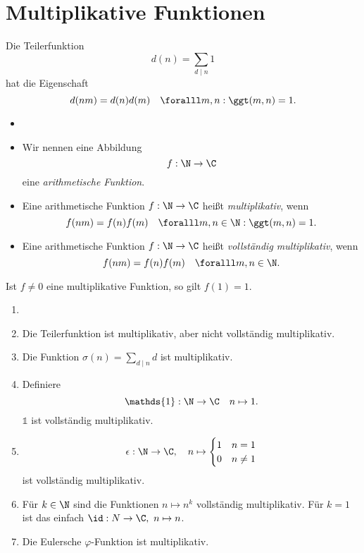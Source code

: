 \chapter{Multiplikative Funktionen}

\begin{exmp*}
	Die Teilerfunktion
	\[ d(n) = \sum_{d \mid n} 1 \]
	hat die Eigenschaft
	\[ d(nm) = d(n)d(m) \quad \foralll m,n: \ggt(m,n)=1. \]
\end{exmp*}

\begin{defn*}
	\begin{itemize}
		\item []
		\item Wir nennen eine Abbildung
			\[ f: \N \to \C \]
			eine \emph{arithmetische Funktion}.
		\item Eine arithmetische Funktion $f: \N \to \C$ heißt \emph{multiplikativ}, wenn
			\[ f(nm) = f(n)f(m) \quad \foralll m,n \in \N: \ggt(m,n)=1. \]
		\item Eine arithmetische Funktion $f: \N \to \C$ heißt \emph{vollständig multiplikativ}, wenn
			\[ f(nm) = f(n)f(m) \quad \foralll m,n \in \N. \] 
	\end{itemize}
\end{defn*}

\begin{rem*}
	Ist $f \neq 0$ eine multiplikative Funktion, so gilt $f(1)=1$.
\end{rem*}

\begin{exmp*}
	\begin{enumerate}[label={\roman*})]
		\item[]
		\item Die Teilerfunktion ist multiplikativ, aber nicht vollständig multiplikativ.
		\item Die Funktion \( \sigma(n) = \sum_{d \mid n} d \) ist multiplikativ.
		\item Definiere \[ \mathds{1}: \N \to \C \quad n \mapsto 1. \] $\mathds{1}$ ist vollständig multiplikativ.
		\item \[ \epsilon: \N \to \C,\quad n \mapsto \begin{cases}
			1 &n=1\\0 &n\neq1
		\end{cases} \] ist vollständig multiplikativ.
		\item Für $k \in \N$ sind die Funktionen $n \mapsto n^k$ vollständig multiplikativ. Für $k=1$ ist das einfach $\id: N \to \C,\ n \mapsto n$.
		\item Die Eulersche $\varphi$-Funktion ist multiplikativ.
	\end{enumerate}
\end{exmp*}

